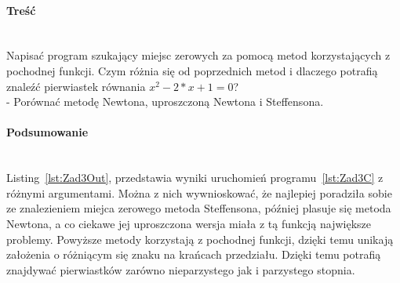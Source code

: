 \paragraph{Treść}~\\
Napisać program szukający miejsc zerowych za pomocą metod korzystających z pochodnej funkcji. Czym różnia się od poprzednich metod i dlaczego potrafią znaleźć pierwiastek równania $ x^2 - 2*x + 1 = 0 $?\\
- Porównać metodę Newtona, uproszczoną Newtona i Steffensona.\\





\paragraph{Podsumowanie}~\\
Listing~\ref{lst:Zad3Out}, przedstawia wyniki uruchomień programu~\ref{lst:Zad3C} z różnymi argumentami.
Można z nich wywnioskować, że najlepiej poradziła sobie ze znalezieniem miejca zerowego metoda Steffensona, później plasuje się metoda Newtona, a co ciekawe jej uproszczona wersja miała z tą funkcją największe problemy.
Powyższe metody korzystają z pochodnej funkcji, dzięki temu unikają założenia o różniącym się znaku na krańcach przedziału.
Dzięki temu potrafią znajdywać pierwiastków zarówno nieparzystego jak i parzystego stopnia. 
